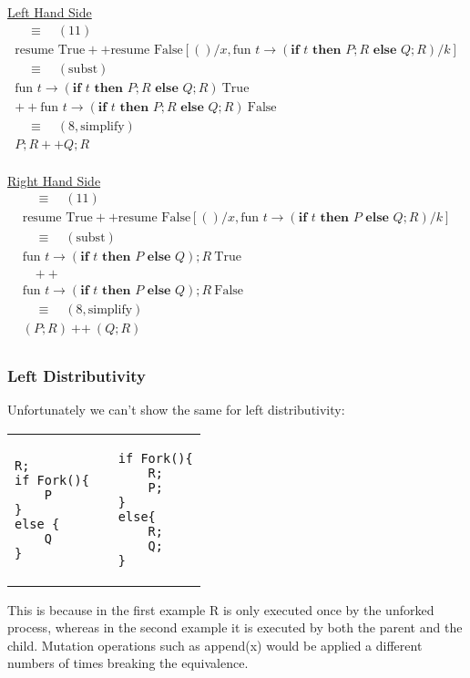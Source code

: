\documentclass[logo,bsc,singlespacing,parskip]{infthesis}
\begin{document}
\underline{Left Hand Side}
\[
\begin{array}{l}

\quad\equiv\quad (11) \\[5pt]
\text{resume True} ++ \text{resume False} [()/x, \text{fun } t \rightarrow (\textbf{if } t \textbf{ then } P;R \textbf{ else } Q;R)/k] \\[5pt]
\quad\equiv\quad (\text{subst}) \\[5pt]
\text{fun } t \rightarrow (\textbf{if } t \textbf{ then } P;R \textbf{ else } Q;R)\ \text{True} \\[2pt]
 \mathbin{++} 
\text{fun } t \rightarrow (\textbf{if } t \textbf{ then } P;R \textbf{ else } Q;R)\ \text{False} \\[5pt]
\quad\equiv\quad (8, \text{simplify}) \\[5pt]
P;R  ++ Q;R \\[1em]
\end{array}
\]

\underline{Right Hand Side}
\[
\begin{array}{l}
\quad\equiv\quad (11) \\[5pt]
\text{resume True} ++ \text{resume False} [()/x, \text{fun } t \rightarrow (\textbf{if } t \textbf{ then } P \textbf{ else } Q;R) / k] \\[5pt]
\quad\equiv\quad (\text{subst}) \\[5pt]
\text{fun } t \rightarrow (\textbf{if } t \textbf{ then } P \textbf{ else } Q);R\ \text{True} \\[2pt]
\quad \mathbin{++} \\
\text{fun } t \rightarrow (\textbf{if } t \textbf{ then } P \textbf{ else } Q);R\ \text{False} \\[5pt]
\quad\equiv\quad (8, \text{simplify}) \\[5pt]
(P;R) \: \text{++} \:(Q;R) \\[5pt]
\end{array}
\]


\subsubsection*{Left Distributivity}

Unfortunately we can't show the same for left distributivity:

\vspace{-2em}
\begin{table}[H]
\centering
\begin{tabular}{p{} c p{}}
\begin{lstlisting}
R;
if Fork(){
    P
}
else {
    Q
}
\end{lstlisting}
&
&
\begin{lstlisting}
if Fork(){
    R; 
    P;
} 
else{
    R; 
    Q; 
}
\end{lstlisting}
\end{tabular}
\end{table}
\vspace{-2em}
This is because in the first example R is only executed once by the unforked process, whereas in the second example it is executed by both the parent and the child. 
Mutation operations such as append(x) would be applied a different numbers of times breaking the equivalence.
\end{document}
